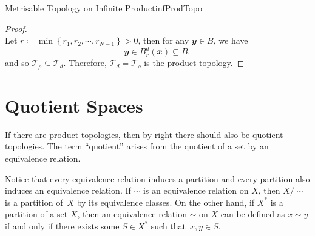 \documentclass[math]{amznotes}
\theoremstyle{remark}
\begin{document}
\begin{probox}{Metrisable Topology on Infinite Product}{infProdTopo}
\begin{proof}
\begin{equation*}
        \end{equation*}
        Let $r \coloneqq \min\left\{r_1, r_2, \cdots, r_{N - 1}\right\} > 0$, then for any $\mathbfit{y} \in B$, we have 
        \begin{equation*}
            \mathbfit{y} \in B_r^{d}\left(\mathbfit{x}\right) \subseteq B,
        \end{equation*} 
        and so $\mathcal{T}_{\rho} \subseteq \mathcal{T}_d$. Therefore, $\mathcal{T}_d = \mathcal{T}_{\rho}$ is the product topology.
    \end{proof}
\end{probox}
\section{Quotient Spaces}
If there are product topologies, then by right there should also be quotient topologies. The term ``quotient'' arises from the quotient of a set by an equivalence relation.

Notice that every equivalence relation induces a partition and every partition also induces an equivalence relation. If $\sim$ is an equivalence relation on $X$, then $X \slash \sim$ is a partition of~$X$ by its equivalence classes. On the other hand, if $X^*$ is a partition of a set $X$, then an equivalence relation $\sim$ on $X$ can be defined as $x \sim y$ if and only if there exists some $S \in X^*$ such that~$x, y \in S$.
\end{document}
